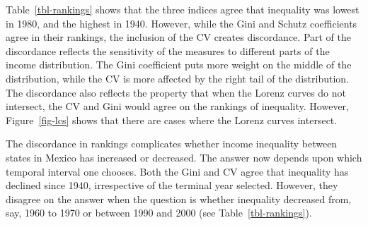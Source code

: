 \documentclass[
  a4paper, 
  twoside,
  final
]{article}
\begin{document}
Table~\ref{tbl-rankings} shows that the three indices agree that
inequality was lowest in 1980, and the highest in 1940. However, while
the Gini and Schutz coefficients agree in their rankings, the inclusion
of the CV creates discordance. Part of the discordance reflects the
sensitivity of the measures to different parts of the income
distribution. The Gini coefficient puts more weight on the middle of the
distribution, while the CV is more affected by the right tail of the
distribution. The discordance also reflects the property that when the
Lorenz curves do not intersect, the CV and Gini would agree on the
rankings of inequality. However, Figure~\ref{fig-lcs} shows that there
are cases where the Lorenz curves intersect.

The discordance in rankings complicates whether income inequality
between states in Mexico has increased or decreased. The answer now
depends upon which temporal interval one chooses. Both the Gini and CV
agree that inequality has declined since 1940, irrespective of the
terminal year selected. However, they disagree on the answer when the
question is whether inequality decreased from, say, 1960 to 1970 or
between 1990 and 2000 (see Table~\ref{tbl-rankings}).
\end{document}
